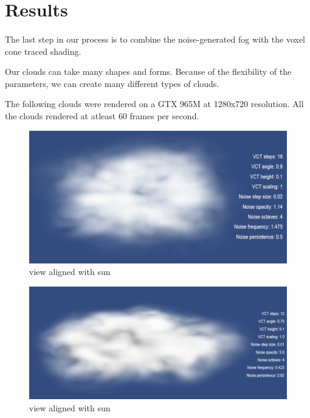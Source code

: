 \newpage
\section{Results}\paragraph{}
The last step in our process is to combine the noise-generated fog with the voxel cone traced shading.

Our clouds can take many shapes and forms. Because of the flexibility of the parameters, we can create many different types of clouds.

The following clouds were rendered on a GTX 965M at 1280x720 resolution. All the clouds rendered at atleast 60 frames per second.

\begin{figure}[H]
\centering
\includegraphics[width=\textwidth]{../res/res2.png}
\caption{view aligned with sun}
\end{figure}

\begin{figure}[H]
\centering
\includegraphics[width=\textwidth]{../res/res4.png}
\caption{view aligned with sun}
\end{figure}

